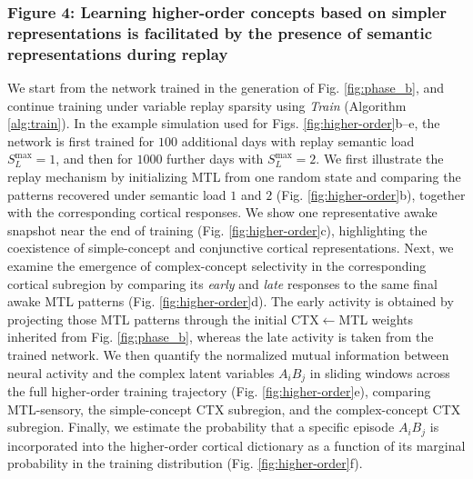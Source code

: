 \documentclass{article}
\begin{document}
\subsubsection*{Figure 4: Learning higher-order concepts based on simpler representations is facilitated by the presence of semantic representations during replay}
We start from the network trained in the generation of Fig. \ref{fig:phase_b}, and continue training under variable replay sparsity using \textit{Train} (Algorithm \ref{alg:train}). In the example simulation used for Figs. \ref{fig:higher-order}b--e, the network is first trained for $100$ additional days with replay semantic load $S^\textrm{max}_L=1$, and then for $1000$ further days with $S^\textrm{max}_L=2$. We first illustrate the replay mechanism by initializing MTL from one random state and comparing the patterns recovered under semantic load $1$ and $2$ (Fig. \ref{fig:higher-order}b), together with the corresponding cortical responses. We show one representative awake snapshot near the end of training (Fig. \ref{fig:higher-order}c), highlighting the coexistence of simple-concept and conjunctive cortical representations.
\newline\newline
Next, we examine the emergence of complex-concept selectivity in the corresponding cortical subregion by comparing its \textit{early} and \textit{late} responses to the same final awake MTL patterns (Fig. \ref{fig:higher-order}d). The early activity is obtained by projecting those MTL patterns through the initial CTX$\leftarrow$MTL weights inherited from Fig. \ref{fig:phase_b}, whereas the late activity is taken from the trained network. We then quantify the normalized mutual information between neural activity and the complex latent variables $A_iB_j$ in sliding windows across the full higher-order training trajectory (Fig. \ref{fig:higher-order}e), comparing MTL-sensory, the simple-concept CTX subregion, and the complex-concept CTX subregion.
\newline\newline
Finally, we estimate the probability that a specific episode $A_iB_j$ is incorporated into the higher-order cortical dictionary as a function of its marginal probability in the training distribution (Fig. \ref{fig:higher-order}f).
\end{document}
